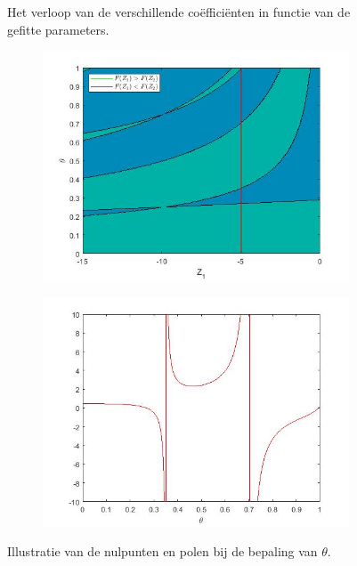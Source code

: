 \documentclass[12pt]{article}
\begin{document}
\begin{figure}[H]
\begin{center}
\begin{subfigure}{0.5\textwidth}
\end{subfigure}
\end{center}
\caption{Het verloop van de verschillende coëfficiënten in functie van de gefitte parameters.}
\label{fig:coefgraphs}
\end{figure}

\begin{figure}[H]
    \begin{subfigure}{0.49\textwidth}
    \includegraphics[width=0.9\linewidth]{contour_theta_RKs2.jpg} 
    \label{fig:contourplot}
    \end{subfigure}
    \begin{subfigure}{0.49\textwidth}
    \includegraphics[width=0.9\linewidth]{contour_theta_RKs2_ex.jpg}
    \label{fig:contourplotex}
    \end{subfigure}
    \caption{Illustratie van de nulpunten en polen bij de bepaling van \(\theta\).}
\end{figure}
\end{document}
